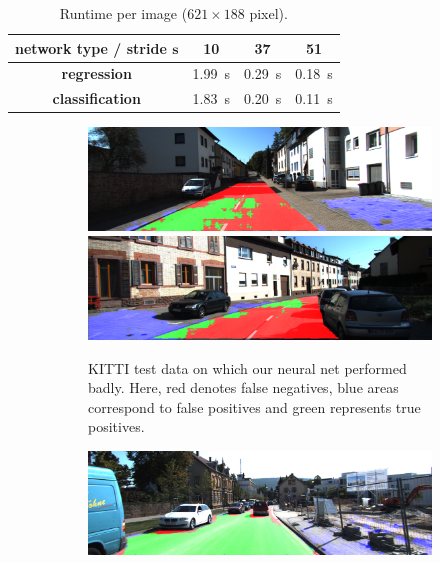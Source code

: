 \begin{table}[tbp]
    \centering
    \begin{tabular}{c|ccc}
        \toprule
        \textbf{network type / stride $\bm{s}$} & 10 & 37 & 51 \\
        \midrule
        \textbf{regression}     & \SI{1.99}{\second} & \SI{0.29}{\second} & \SI{0.18}{\second} \\
        \textbf{classification} & \SI{1.83}{\second} & \SI{0.20}{\second}  & \SI{0.11}{\second}\\
        \bottomrule
    \end{tabular}
    \caption{Runtime per image ($621 \times 188$ pixel).}%
\label{tab:runtime}
\end{table}

\begin{figure}[]
    \begin{subfigure}[t]{\columnwidth}
        \includegraphics[width=\columnwidth]{figures/kitti_eval/Persp_um_road_000077.png}
        \includegraphics[width=\columnwidth]{figures/kitti_eval/Persp_um_road_000095.png}
        \caption{KITTI test data on which our neural net performed badly. Here, red denotes false negatives, blue areas correspond to false positives and green represents true positives.}%
\label{fig:sfig1}
    \end{subfigure}
    \begin{subfigure}[t]{\columnwidth}
        \includegraphics[width=\columnwidth]{figures/kitti_eval/Persp_uu_road_000027.png}

\end{subfigure}
\end{figure}
